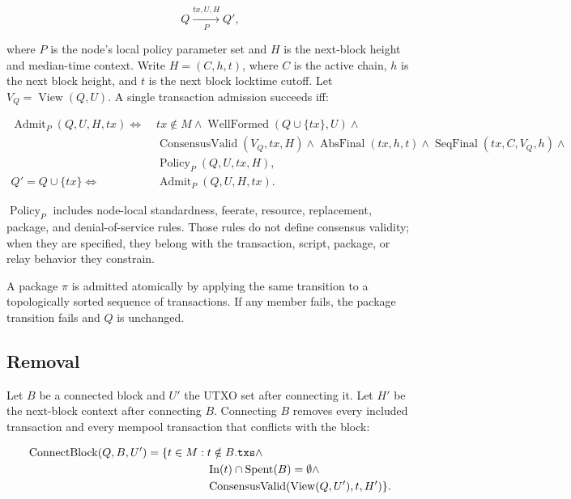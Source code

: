 \[
  Q \xrightarrow[P]{tx,U,H} Q',
\]

where \(P\) is the node's local policy parameter set and \(H\) is the next-block
height and median-time context. Write \(H=(C,h,t)\), where \(C\) is the active
chain, \(h\) is the next block height, and \(t\) is the next block locktime
cutoff. Let \(V_Q=\operatorname{View}(Q,U)\). A single transaction admission
succeeds iff:

\[
\begin{aligned}
\operatorname{Admit}_{P}(Q,U,H,tx) \Longleftrightarrow\;&
  tx \notin M \wedge
  \operatorname{WellFormed}(Q \cup \{tx\},U) \wedge \\
& \operatorname{ConsensusValid}(V_Q,tx,H) \wedge
  \operatorname{AbsFinal}(tx,h,t) \wedge
  \operatorname{SeqFinal}(tx,C,V_Q,h) \wedge \\
& \operatorname{Policy}_{P}(Q,U,tx,H),\\
Q' = Q \cup \{tx\} \Longleftrightarrow\;&
  \operatorname{Admit}_{P}(Q,U,H,tx).
\end{aligned}
\]

\(\operatorname{Policy}_{P}\) includes node-local standardness, feerate,
resource, replacement, package, and denial-of-service rules. Those rules do not
define consensus validity; when they are specified, they belong with the
transaction, script, package, or relay behavior they constrain.

A package \(\pi\) is admitted atomically by applying the same transition to a
topologically sorted sequence of transactions. If any member fails, the package
transition fails and \(Q\) is unchanged.

\subsection{Removal}

Let \(B\) be a connected block and \(U'\) the UTXO set after connecting it.
Let \(H'\) be the next-block context after connecting \(B\).
Connecting \(B\) removes every included transaction and every mempool
transaction that conflicts with the block:

\[
\begin{aligned}
\operatorname{ConnectBlock}(Q,B,U') =
\{t \in M:\;&t \notin B.\text{\texttt{txs}} \wedge \\
&\operatorname{In}(t) \cap \operatorname{Spent}(B)=\emptyset \wedge \\
&\operatorname{ConsensusValid}(\operatorname{View}(Q,U'),t,H')\}.
\end{aligned}
\]

